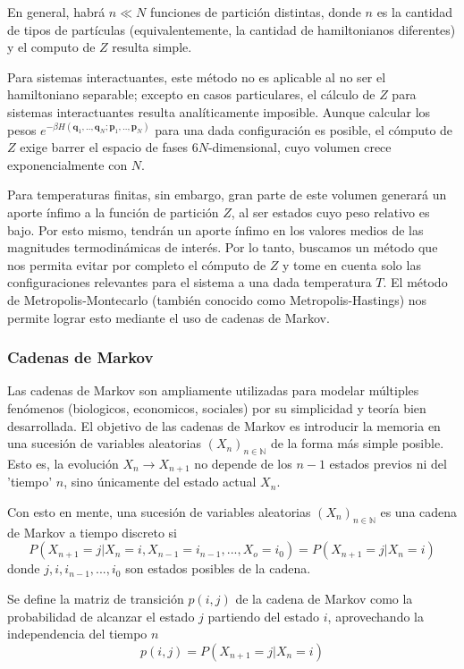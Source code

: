 En general, habrá $n\ll N$ funciones de partición distintas, donde $n$ es la cantidad de tipos de partículas (equivalentemente, la cantidad de hamiltonianos diferentes) y el computo de $Z$ resulta simple.

Para sistemas interactuantes, este método no es aplicable al no ser el hamiltoniano separable; excepto en casos particulares, el cálculo de $Z$ para sistemas interactuantes resulta analíticamente imposible.
Aunque calcular los pesos $e^{-\beta H(\mathbf{q}_1,..,\mathbf{q}_N;\mathbf{p}_1,..,\mathbf{p}_N)}$ para una dada configuración es posible, el cómputo de $Z$ exige barrer el espacio de fases $6N$-dimensional,
cuyo volumen crece exponencialmente con $N$.

Para temperaturas finitas, sin embargo, gran parte de este volumen generará un aporte ínfimo a la función de partición $Z$, al ser estados cuyo peso relativo es bajo.
Por esto mismo, tendrán un aporte ínfimo en los valores medios de las magnitudes termodinámicas de interés.
Por lo tanto, buscamos un método que nos permita evitar por completo el cómputo de $Z$ y tome en cuenta solo las configuraciones relevantes para el sistema a una dada temperatura $T$.
El método de Metropolis-Montecarlo (también conocido como Metropolis-Hastings) nos permite lograr esto mediante el uso de cadenas de Markov.

\subsubsection{Cadenas de Markov}

Las cadenas de Markov son ampliamente utilizadas para modelar múltiples fenómenos (biologicos, economicos, sociales) por su simplicidad y teoría bien desarrollada.
El objetivo de las cadenas de Markov es introducir la memoria en una sucesión de variables aleatorias $(X_n)_{n\in \mathbb{N}}$ de la forma más simple posible.
Esto es, la evolución $X_n \to X_{n+1}$ no depende de los $n-1$ estados previos ni del 'tiempo' $n$, sino únicamente del estado actual $X_n$.

Con esto en mente, una sucesión de variables aleatorias $(X_n)_{n\in \mathbb{N}}$ es una cadena de Markov a tiempo discreto si
\[ P(X_{n+1}=j | X_n = i, X_{n-1} = i_{n-1}, ..., X_o = i_0) = P(X_{n+1}=j | X_n = i)  \]
donde $j, i, i_{n-1}, ..., i_0$ son estados posibles de la cadena.

Se define la matriz de transición $p(i,j)$ de la cadena de Markov como la probabilidad de alcanzar el estado $j$ partiendo del estado $i$, aprovechando la independencia del tiempo $n$
\[ p(i,j) = P(X_{n+1} = j | X_n = i) \]

